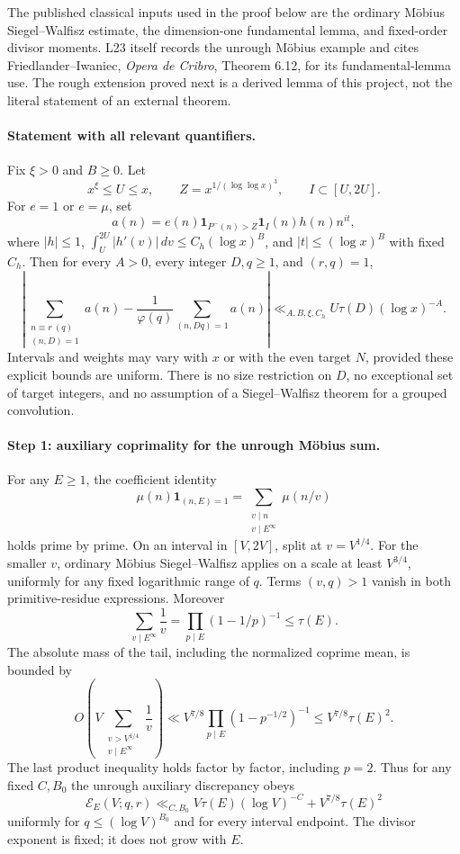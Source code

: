The published classical inputs used in the proof below are the ordinary
M\"obius Siegel--Walfisz estimate, the dimension-one fundamental lemma,
and fixed-order divisor moments. L23 itself records the unrough
M\"obius example and cites Friedlander--Iwaniec,
\emph{Opera de Cribro}, Theorem 6.12, for its fundamental-lemma use.
The rough extension proved next is a derived lemma of this project,
not the literal statement of an external theorem.

\paragraph{Statement with all relevant quantifiers.}
Fix $\xi>0$ and $B\ge0$. Let
\[
 x^\xi\le U\le x,\qquad Z=x^{1/(\log\log x)^3},
 \qquad I\subset[U,2U].
\]
For $e=1$ or $e=\mu$, set
\[
 a(n)=e(n)\mathbf1_{P^-(n)>Z}\mathbf1_I(n)h(n)n^{it},
\]
where $|h|\le1$, $\int_U^{2U}|h'(v)|\,dv\le C_h(\log x)^B$,
and $|t|\le(\log x)^B$ with fixed $C_h$.
Then for every $A>0$, every integer $D,q\ge1$, and $(r,q)=1$,
\begin{equation}\label{eq:focused-rough-sw-conclusion}
 \left|\sum_{\substack{n\equiv r\ (q)\\(n,D)=1}}a(n)
 -\frac1{\varphi(q)}\sum_{(n,Dq)=1}a(n)\right|
 \ll_{A,B,\xi,C_h} U\tau(D)(\log x)^{-A}.
\end{equation}
Intervals and weights may vary with $x$ or with the even target $N$,
provided these explicit bounds are uniform. There is no size restriction
on $D$, no exceptional set of target integers, and no assumption of a
Siegel--Walfisz theorem for a grouped convolution.

\paragraph{Step 1: auxiliary coprimality for the unrough M\"obius sum.}
For any $E\ge1$, the coefficient identity
\[
 \mu(n)\mathbf1_{(n,E)=1}
 =\sum_{\substack{v\mid n\\v\mid E^\infty}}\mu(n/v)
\]
holds prime by prime. On an interval in $[V,2V]$, split at
$v=V^{1/4}$. For the smaller $v$, ordinary M\"obius
Siegel--Walfisz applies on a scale at least $V^{3/4}$, uniformly for
any fixed logarithmic range of $q$. Terms $(v,q)>1$ vanish in both
primitive-residue expressions. Moreover
\[
 \sum_{v\mid E^\infty}\frac1v
 =\prod_{p\mid E}(1-1/p)^{-1}\le\tau(E).
\]
The absolute mass of the tail, including the normalized coprime mean,
is bounded by
\[
 O\left(V\sum_{\substack{v>V^{1/4}\\v\mid E^\infty}}\frac1v\right)
 \ll V^{7/8}\prod_{p\mid E}(1-p^{-1/2})^{-1}
 \le V^{7/8}\tau(E)^2.
\]
The last product inequality holds factor by factor, including $p=2$.
Thus for any fixed $C,B_0$ the unrough auxiliary discrepancy obeys
\begin{equation}\label{eq:focused-unrough-auxiliary}
 \mathcal E_E(V;q,r)
 \ll_{C,B_0} V\tau(E)(\log V)^{-C}
                   +V^{7/8}\tau(E)^2
\end{equation}
uniformly for $q\le(\log V)^{B_0}$ and for every interval endpoint.
The divisor exponent is fixed; it does not grow with $E$.

